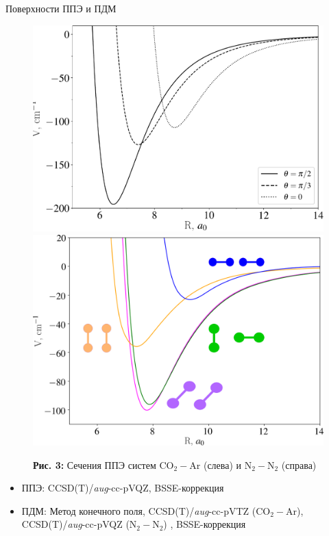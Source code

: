 \documentclass[10pt,usenames,pdf,hyperref={unicode},dvipsnames]{beamer}
\newcommand{\mycaption}[2]{
    \textbf{#1:} #2
}
\begin{document}
\begin{frame}{Поверхности ППЭ и ПДМ}
    \begin{figure}[H]
        \vspace*{-0.5cm}
        \includegraphics[width=0.49\linewidth]{./pictures/co2-ar-potential-legend-crop.pdf}
        \includegraphics[width=0.49\linewidth]{./pictures/n2n2_potential-trim.png}
        \mycaption{Рис. 3}{Сечения ППЭ систем CO$_2-$Ar (слева) и N$_2-$N$_2$ (справа)}
    \end{figure}
   
    \vspace*{-0.3cm}
    \begin{itemize}
        \item ППЭ: CCSD(T)/\textit{aug}-cc-pVQZ, BSSE-коррекция
        \item ПДМ: Метод конечного поля, CCSD(T)/\textit{aug}-cc-pVTZ (CO$_2-$Ar), CCSD(T)/\textit{aug}-cc-pVQZ (N$_2-$N$_2$) , BSSE-коррекция
    \end{itemize}
\end{frame}
\end{document}
